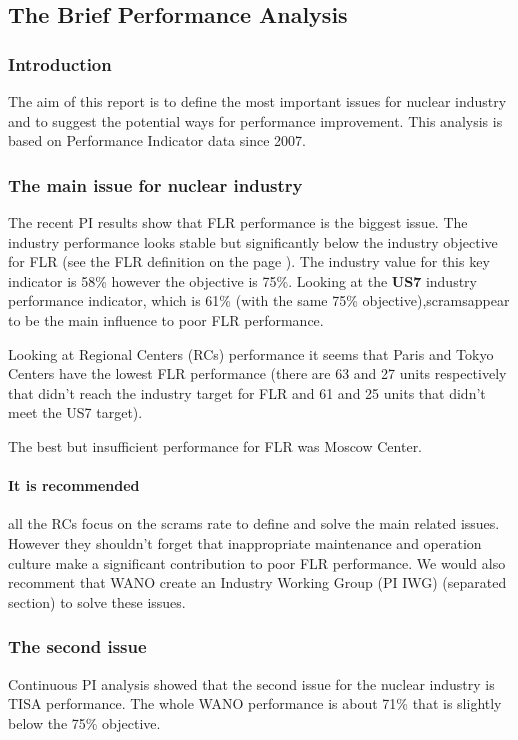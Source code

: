 \subsection*{The Brief Performance Analysis}

\subsubsection*{Introduction}
The aim of this report is to define the most important issues for
nuclear industry and to suggest the potential ways for performance
improvement. This analysis is based on Performance Indicator data
since 2007.

\subsubsection*{The main issue for nuclear industry} 
The recent PI results show that FLR performance is the
biggest issue. The industry performance looks stable but
significantly below the industry objective for FLR (see the FLR
definition on the page \pageref{FLR}). The industry value for this key
indicator is 58\% however the objective is 75\%. Looking at the 
\textbf{US7} industry performance indicator, which is 61\% (with the same 75\%
objective),scramsappear to be the main influence to poor FLR performance.


Looking at Regional Centers (RCs) performance it seems that Paris and Tokyo
Centers have the lowest FLR performance (there are 63 and 27 units
respectively that didn't reach the industry target for FLR and 61 and
25 units that didn't meet the US7 target).

The best but insufficient performance for FLR was Moscow Center.

\paragraph{It is recommended} all the RCs focus on the scrams rate to define and solve the main related
issues. However they shouldn't forget that inappropriate maintenance
and operation culture make a significant contribution to poor FLR
performance. We would also recomment that WANO create an Industry Working Group
(PI IWG) (separated section) to solve these issues.


\subsubsection*{The second issue} 
Continuous PI analysis showed that the second issue for the nuclear
industry is TISA performance. The whole WANO performance is about 71\%
that is slightly below the 75\% objective.

